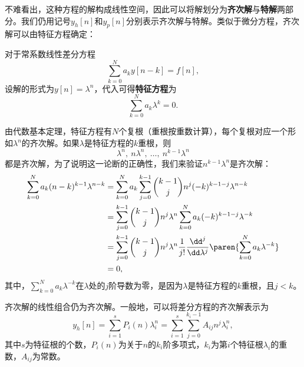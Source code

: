 不难看出，这种方程的解构成线性空间，因此可以将解划分为\textbf{齐次解}与\textbf{特解}两部分。我们仍用记号$y_h[n]$和$y_p[n]$分别表示齐次解与特解。类似于微分方程，齐次解可以由特征方程确定：
\begin{definition}[常系数线性差分方程的特征方程]
    对于常系数线性差分方程
    \begin{equation}
        \sum_{k=0}^{N}a_k y[n-k]=f[n],
    \end{equation}
    设解的形式为$y[n]=\lambda^n$，代入可得\textbf{特征方程}为
    \begin{equation}
        \sum_{k=0}^{N}a_k \lambda^k=0.
    \end{equation}
\end{definition}

由代数基本定理，特征方程有$N$个复根（重根按重数计算），每个复根对应一个形如$\lambda^n$的齐次解。如果$\lambda$是特征方程的$k$重根，则
\begin{equation}
    \lambda^n,\ n\lambda^n,\ \dots,\ n^{k-1}\lambda^n
\end{equation}
都是齐次解，为了说明这一论断的正确性，我们来验证$n^{k-1}\lambda^n$是齐次解：
\begin{align}
    \sum_{k=0}^{N}a_k (n-k)^{k-1}\lambda^{n-k}&=\sum_{k=0}^{N}a_k \sum_{j=0}^{k-1}\binom{k-1}{j}n^j(-k)^{k-1-j}\lambda^{n-k} \nonumber \\
    &=\sum_{j=0}^{k-1}\binom{k-1}{j}n^j\lambda^n\sum_{k=0}^{N}a_k (-k)^{k-1-j}\lambda^{-k} \nonumber \\
    &=\sum_{j=0}^{k-1}\binom{k-1}{j}n^j\lambda^n\frac{1}{j!}\frac{\dd^{j}}{\dd\lambda^{j}}\paren{\sum_{k=0}^{N}a_k \lambda^{-k}} \nonumber \\
    &=0,
\end{align}
其中，$\sum_{k=0}^{N}a_k \lambda^{-k}$在$\lambda$处的$j$阶导数为零，是因为$\lambda$是特征方程的$k$重根，且$j<k$。

齐次解的线性组合仍为齐次解。一般地，可以将差分方程的齐次解表示为
\begin{equation}
    y_h[n]=\sum_{i=1}^{s}P_i(n) \lambda_i^n=\sum_{i=1}^{s}\sum_{j=0}^{k_i-1}A_{ij} n^j \lambda_i^n,
\end{equation}
其中$s$为特征根的个数，$P_i(n)$为关于$n$的$k_i$阶多项式，$k_i$为第$i$个特征根$\lambda_i$的重数，$A_{ij}$为常数。

